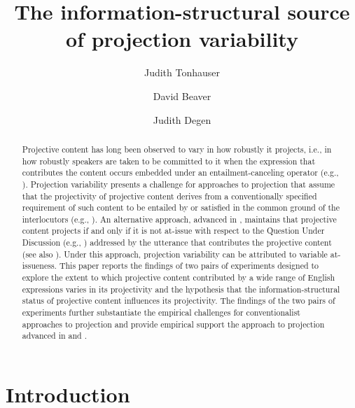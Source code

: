 \documentclass[11pt,fleqn]{article}
\title{The information-structural source of projection variability}
\author[$\bullet$]{Judith Tonhauser}
\author[$\circ$]{David Beaver}
\author[$\triangleright$]{Judith Degen}
\affil[$\bullet$]{The Ohio State University}
\affil[$\circ$]{University of Texas at Austin}
\affil[$\triangleright$]{Stanford University}
\newcommand{\6}{\mbox{$[\hspace*{-.6mm}[$}}
\newcommand{\9}{\mbox{$]\hspace*{-.6mm}]$}}
\begin{document}
\maketitle

\begin{abstract}

Projective content has long been observed to vary in how robustly it projects, i.e., in how robustly speakers are taken to be committed to it when the expression that contributes the content occurs embedded under an entailment-canceling operator (e.g., \citealt{karttunen71b,ccmg90,simons01,abusch10}). Projection variability presents a challenge for approaches to projection that assume that the projectivity of projective content derives from a conventionally specified requirement of such content to be entailed by or satisfied in the common ground of the interlocutors (e.g., \citealt{heim83,vds92}). An alternative approach, advanced in \citet{brst-salt10}, maintains that projective content projects if and only if it is not at-issue with respect to the Question Under Discussion (e.g., \citealt{roberts12}) addressed by the utterance that contributes the projective content (see also \citealt{brst-ar}). Under this approach, projection variability can be attributed to variable at-issueness. This paper reports the findings of two pairs of experiments designed to explore the extent to which projective content contributed by a wide range of English expressions varies in its projectivity and the hypothesis that the information-structural status of projective content influences its projectivity. The findings of the two pairs of experiments further substantiate the empirical challenges for conventionalist approaches to projection and provide empirical support the approach to projection advanced in \citealt{brst-salt10} and \citealt{brst-ar}.

\end{abstract}


			
\section{Introduction}\label{s1}
\end{document}
